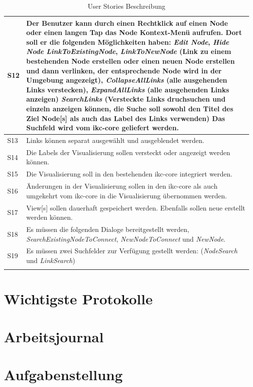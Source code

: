 \begin{longtable}{|p{1cm} | p{10.8cm} |}
S12 & Der Benutzer kann durch einen Rechtklick auf einen \gls{Node} oder einen langen Tap das \gls{Node} Kontext-Menü aufrufen. Dort soll er die folgenden Möglichkeiten haben: \textit{Edit Node}, \textit{Hide Node} \textit{LinkToExistingNode}, \textit{LinkToNewNode} (Link zu einem bestehenden \gls{Node} erstellen oder einen neuen \gls{Node} erstellen und dann verlinken, der entsprechende \gls{Node} wird in der Umgebung angezeigt), \textit{CollapseAllLinks} (alle ausgehenden Links verstecken), \textit{ExpandAllLinks} (alle ausgehenden Links anzeigen) \textit{SearchLinks} (Versteckte Links druchsuchen und einzeln anzeigen können, die Suche soll sowohl den Titel des Ziel \gls{Node}[s] als auch das Label des Links verwenden) Das Suchfeld wird vom \gls{ikc-core} geliefert werden. \\ \hline
S13 & Links können separat ausgewählt und ausgeblendet werden.  \\ \hline
S14 & Die Labels der Visualisierung sollen versteckt oder angezeigt werden können.\\ \hline
S15 & Die Visualisierung soll in den bestehenden \gls{ikc-core} integriert werden. \\ \hline
S16 & Änderungen in der Visualisierung sollen in den \gls{ikc-core} als auch umgekehrt vom \gls{ikc-core} in die Visualisierung übernommen werden. \\ \hline
S17 & \gls{View}[s] sollen dauerhaft gespeichert werden. Ebenfalls sollen neue erstellt werden können.          \\ \hline
S18 & Es müssen die folgenden Dialoge bereitgestellt werden, \textit{SearchExistingNodeToConnect}, \textit{NewNodeToConnect} und \textit{NewNode}.\\ \hline
S19 & Es müssen zwei Suchfelder zur Verfügung gestellt werden: (\textit{NodeSearch} und \textit{LinkSearch})\\ \hline
    \caption{User Stories Beschreibung}
\label{user-stories-desc}
\end{longtable}

\section{Wichtigste Protokolle}
\label{protokolle}


\section{Arbeitsjournal}
\label{arbeitsjournal}


\section{Aufgabenstellung}
\label{aufgabenstellung}


